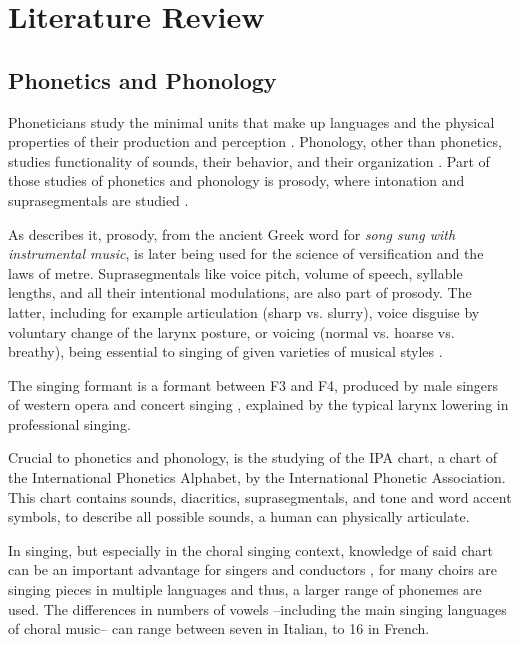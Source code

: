 \chapter{Literature Review}
\label{chap:Literature Review}
\pagestyle{plain}

\section{Phonetics and Phonology}
\label{Phonetics and Phonology}

Phoneticians study the minimal units that make up languages and the physical properties of their production and perception \cite{gudivada2018linguistics}. Phonology, other than phonetics, studies functionality of sounds, their behavior, and their organization \cite{davenport2013introducing}. 
Part of those studies of phonetics and phonology is prosody, where intonation and suprasegmentals are studied \cite{halliday1967intonation,fox2000prosodic}.

As \cite{nooteboom1997prosody} describes it, prosody, from the ancient Greek word for \textit{song sung with instrumental music}, is later being used for the science of versification and the laws of metre. Suprasegmentals like voice pitch, volume of speech, syllable lengths, and all their intentional modulations, are also part of prosody. The latter, including for example articulation (sharp vs. slurry), voice disguise by voluntary change of the larynx posture, or voicing (normal vs. hoarse vs. breathy), being essential to singing of given varieties of musical styles \cite{nooteboom1997prosody,thalen2001describing}.

The singing formant is a formant between F3 and F4, produced by male singers of western opera and concert singing \cite{sundberg1977acoustics}, explained by the typical larynx lowering in professional singing.

Crucial to phonetics and phonology, is the studying of the IPA chart, a chart of the International Phonetics Alphabet, by the International Phonetic Association. This chart contains sounds, diacritics, suprasegmentals, and tone and word accent symbols, to describe all possible sounds, a human can physically articulate. 

In singing, but especially in the choral singing context, knowledge of said chart can be an important advantage for singers and conductors \cite{adler1965phonetics}, for many choirs are singing pieces in multiple languages and thus, a larger range of phonemes are used. The differences in numbers of vowels --including the main singing languages of choral music-- can range between seven in Italian, to 16 in French.

